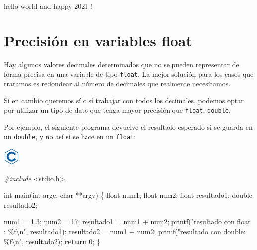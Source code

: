 \documentclass[
]{book}
\newenvironment{Shaded}{\begin{snugshade}}{\end{snugshade}}
\newcommand{\ControlFlowTok}[1]{\textcolor[rgb]{0.13,0.29,0.53}{\textbf{#1}}}
\newcommand{\DataTypeTok}[1]{\textcolor[rgb]{0.13,0.29,0.53}{#1}}
\newcommand{\DecValTok}[1]{\textcolor[rgb]{0.00,0.00,0.81}{#1}}
\newcommand{\FloatTok}[1]{\textcolor[rgb]{0.00,0.00,0.81}{#1}}
\newcommand{\ImportTok}[1]{#1}
\newcommand{\NormalTok}[1]{#1}
\newcommand{\PreprocessorTok}[1]{\textcolor[rgb]{0.56,0.35,0.01}{\textit{#1}}}
\newcommand{\SpecialCharTok}[1]{\textcolor[rgb]{0.00,0.00,0.00}{#1}}
\newcommand{\StringTok}[1]{\textcolor[rgb]{0.31,0.60,0.02}{#1}}
\begin{document}
\begin{Shaded}
\begin{Highlighting}[]
\NormalTok{hello world and happy }\DecValTok{2021}\NormalTok{ !}
\end{Highlighting}
\end{Shaded}

\hypertarget{precisiuxf3n-en-variables-float}{%
\section{Precisión en variables float}\label{precisiuxf3n-en-variables-float}}

Hay algunos valores decimales determinados que no se pueden representar de forma precisa en una variable de tipo \texttt{float}. La mejor solución para los casos que tratamos es redondear al número de decimales que realmente necesitamos.

Si en cambio queremos sí o sí trabajar con todos los decimales, podemos optar por utilizar un tipo de dato que tenga mayor precisión que \texttt{float}: \texttt{double}.

Por ejemplo, el siguiente programa devuelve el resultado esperado si se guarda en un \texttt{double}, y no así si se hace en un \texttt{float}:

\includegraphics{./img/c.png}

\begin{Shaded}
\begin{Highlighting}[]
\PreprocessorTok{\#include }\ImportTok{\textless{}stdio.h\textgreater{}}

\DataTypeTok{int}\NormalTok{ main(}\DataTypeTok{int}\NormalTok{ argc, }\DataTypeTok{char}\NormalTok{ **argv) \{ }
    \DataTypeTok{float}\NormalTok{ num1; }
    \DataTypeTok{float}\NormalTok{ num2;}
    \DataTypeTok{float}\NormalTok{ resultado1; }
    \DataTypeTok{double}\NormalTok{ resultado2; }
    
\NormalTok{    num1 = }\FloatTok{1.3}\NormalTok{; }
\NormalTok{    num2 = }\DecValTok{17}\NormalTok{;}
\NormalTok{    resultado1 = num1 + num2; }
\NormalTok{    printf(}\StringTok{"resultado con float : \%f}\SpecialCharTok{\textbackslash{}n}\StringTok{"}\NormalTok{, resultado1); }
\NormalTok{    resultado2 = num1 + num2; }
\NormalTok{    printf(}\StringTok{"resultado con double: \%f}\SpecialCharTok{\textbackslash{}n}\StringTok{"}\NormalTok{, resultado2); }
    \ControlFlowTok{return} \DecValTok{0}\NormalTok{; }
\NormalTok{\}}
\end{Highlighting}
\end{Shaded}
\end{document}
